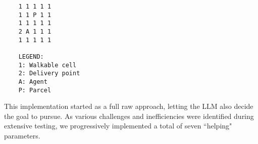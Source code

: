 \vspace{1mm}
\begin{codewindow}
  [Text]  \begin{lstlisting}
    1 1 1 1 1
    1 1 P 1 1
    1 1 1 1 1
    2 A 1 1 1
    1 1 1 1 1

    LEGEND:
    1: Walkable cell
    2: Delivery point
    A: Agent
    P: Parcel
\end{lstlisting}
\end{codewindow}
\vspace{1mm}

This implementation started as a full raw approach, letting the LLM also decide
the goal to pursue. As various challenges and inefficiencies were identified during
extensive testing, we progressively implemented a total of seven ``helping" parameters.

